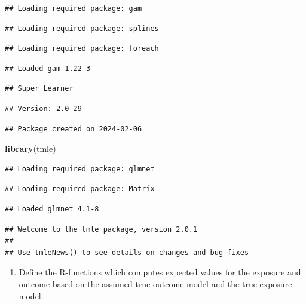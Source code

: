 \documentclass[
]{book}
\newenvironment{Shaded}{\begin{snugshade}}{\end{snugshade}}
\newcommand{\FunctionTok}[1]{\textcolor[rgb]{0.13,0.29,0.53}{\textbf{#1}}}
\newcommand{\NormalTok}[1]{#1}
\providecommand{\tightlist}{%
  \setlength{\itemsep}{0pt}\setlength{\parskip}{0pt}}
\begin{document}
\begin{verbatim}
## Loading required package: gam
\end{verbatim}

\begin{verbatim}
## Loading required package: splines
\end{verbatim}

\begin{verbatim}
## Loading required package: foreach
\end{verbatim}

\begin{verbatim}
## Loaded gam 1.22-3
\end{verbatim}

\begin{verbatim}
## Super Learner
\end{verbatim}

\begin{verbatim}
## Version: 2.0-29
\end{verbatim}

\begin{verbatim}
## Package created on 2024-02-06
\end{verbatim}

\begin{Shaded}
\begin{Highlighting}[]
\FunctionTok{library}\NormalTok{(tmle)}
\end{Highlighting}
\end{Shaded}

\begin{verbatim}
## Loading required package: glmnet
\end{verbatim}

\begin{verbatim}
## Loading required package: Matrix
\end{verbatim}

\begin{verbatim}
## Loaded glmnet 4.1-8
\end{verbatim}

\begin{verbatim}
## Welcome to the tmle package, version 2.0.1
## 
## Use tmleNews() to see details on changes and bug fixes
\end{verbatim}

\begin{enumerate}
\def\labelenumi{\arabic{enumi}.}
\setcounter{enumi}{1}
\tightlist
\item
  Define the R-functions which computes expected values for the
  exposure and outcome based on the assumed true outcome model and the
  true exposure model.
\end{enumerate}
\end{document}
